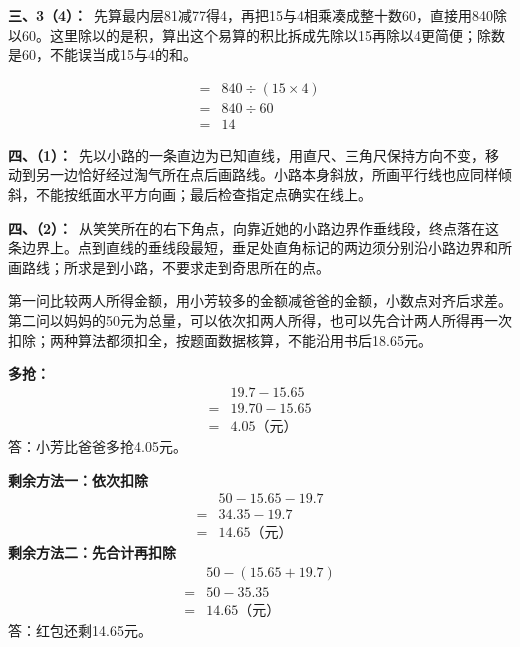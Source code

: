 \documentclass[multi=snippet,border=0pt]{standalone}
\newenvironment{snippet}[3]{\begin{minipage}{#1bp}\color{answerred}\fontsize{#2}{#3}\selectfont\raggedright}{\end{minipage}}
\begin{document}
\begin{snippet}{505}{11.5}{14}\textbf{三、3（4）：}\ 先算最内层81减77得4，再把15与4相乘凑成整十数60，直接用840除以60。这里除以的是积，算出这个易算的积比拆成先除以15再除以4更简便；除数是60，不能误当成15与4的和。\end{snippet}
\begin{snippet}{200.567}{10.5}{12.8}\[\begin{aligned}={}&840\div(15\times4)\\={}&840\div60\\={}&14\end{aligned}\]\end{snippet}
\begin{snippet}{505}{11.5}{14}\textbf{四、（1）：}\ 先以小路的一条直边为已知直线，用直尺、三角尺保持方向不变，移动到另一边恰好经过淘气所在点后画路线。小路本身斜放，所画平行线也应同样倾斜，不能按纸面水平方向画；最后检查指定点确实在线上。\end{snippet}
\begin{snippet}{505}{11.5}{14}\textbf{四、（2）：}\ 从笑笑所在的右下角点，向靠近她的小路边界作垂线段，终点落在这条边界上。点到直线的垂线段最短，垂足处直角标记的两边须分别沿小路边界和所画路线；所求是到小路，不要求走到奇思所在的点。\end{snippet}
\begin{snippet}{505}{11.5}{14}第一问比较两人所得金额，用小芳较多的金额减爸爸的金额，小数点对齐后求差。第二问以妈妈的50元为总量，可以依次扣两人所得，也可以先合计两人所得再一次扣除；两种算法都须扣全，按题面数据核算，不能沿用书后18.65元。\par \textbf{多抢：}\[\begin{aligned} &19.7-15.65\\={}&19.70-15.65\\={}&4.05\text{（元）}\end{aligned}\]答：小芳比爸爸多抢4.05元。\par \textbf{剩余方法一：依次扣除}\[\begin{aligned} &50-15.65-19.7\\={}&34.35-19.7\\={}&14.65\text{（元）}\end{aligned}\]\textbf{剩余方法二：先合计再扣除}\[\begin{aligned} &50-(15.65+19.7)\\={}&50-35.35\\={}&14.65\text{（元）}\end{aligned}\]答：红包还剩14.65元。\end{snippet}
\end{document}
